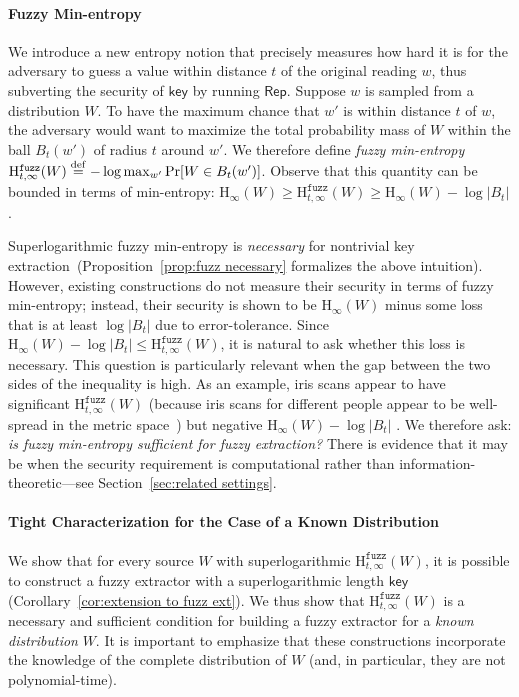 \documentclass[11pt]{article}
\newcommand{\secref}[1]{\mbox{Section~\ref{#1}}}
\newcommand{\corref}[1]{\mbox{Corollary~\ref{#1}}}
\newcommand{\propref}[1]{\mbox{Proposition~\ref{#1}}}
\newcommand{\class}[1]{{\ensuremath{\mathsf{#1}}}}
\newcommand{\key}{\ensuremath{\class{key}}\xspace}
\newcommand{\rep}{\ensuremath{\class{Rep}}\xspace}
\newcommand{\eqdef}{\stackrel{\rm def}{=}}
\newcommand{\Hoo}{\mathrm{H}_\infty}
\newcommand{\Hfuzz}{\mathrm{H}^{\mathtt{fuzz}}_{t,\infty}}
\begin{document}
\paragraph{Fuzzy Min-entropy}
We introduce a new entropy notion that precisely measures how hard it is for the adversary to guess a value within distance $t$ of the original reading $w$, thus subverting the security of $\key$ by running $\rep$. Suppose $w$ is sampled from a distribution $W$.   To have the maximum chance that $w'$ is within distance $t$ of $w$, the adversary would want to maximize the total probability mass of $W$ within the ball $B_t(w')$ of radius $t$ around $w'$.
We  therefore define \emph{fuzzy min-entropy} $\Hfuzz(W) \eqdef -\log \max_{w'} \Pr[W\in B_t(w')]$.  Observe that this quantity can be bounded in terms of min-entropy: $\Hoo(W) \ge \Hfuzz(W) \ge \Hoo(W)-\log |B_t|$.

Superlogarithmic fuzzy min-entropy  is \emph{necessary} for nontrivial key extraction~(\propref{prop:fuzz necessary} formalizes the above intuition). 
However, existing constructions do not measure their security in terms of fuzzy min-entropy; instead, their security is shown to be  $\Hoo(W)$ minus some loss that is at least $\log |B_t|$ due to error-tolerance. Since $\Hoo(W)-\log |B_t| \le \Hfuzz(W)$, it is natural to ask whether this loss is necessary. This question is particularly relevant when the gap between the two sides of the inequality is high.  As an example, iris scans appear to have significant $\Hfuzz(W)$ (because iris scans for different people appear to be well-spread in the metric space~\cite{daugman2006probing}) but negative $\Hoo(W) -\log |B_t|$ \cite[Section 5]{blanton2009biometric}. We therefore ask: \emph{is fuzzy min-entropy sufficient for fuzzy extraction?} There is evidence that it may be when the security requirement is computational rather than information-theoretic---see \secref{sec:related settings}. 



\paragraph{Tight Characterization for the Case of a Known Distribution}
We show that for every source $W$ with superlogarithmic $\Hfuzz(W)$, it is possible to construct a fuzzy extractor with a superlogarithmic length $\key$ (\corref{cor:extension to fuzz ext}). We thus show that $\Hfuzz(W)$ is a necessary and sufficient condition for building a fuzzy extractor for a \emph{known distribution} $W$.  It is important to emphasize that these constructions incorporate the knowledge of the complete distribution of $W$ (and, in particular, they are not polynomial-time).
\end{document}
